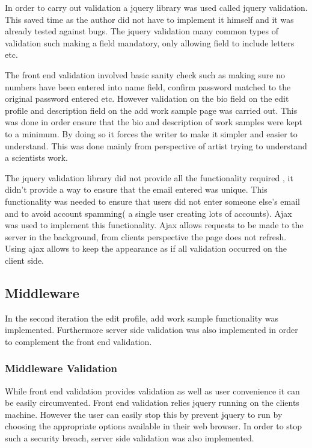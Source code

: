 \documentclass[a4paper,oneside,11pt]{report}
\begin{document}
In order to carry out validation a jquery library was used called jquery validation. This saved time as the author did not have to implement it himself and it was already tested against bugs. The jquery validation many common types of validation such making a field mandatory, only allowing field to include letters etc. 

The front end validation involved basic sanity check such as making sure no numbers have been entered into name field, confirm password matched to the original password entered etc. However validation on the bio field on the edit profile and description field on the add work sample page was carried out. This was done in order ensure that the bio and description of work samples were kept to a minimum. By doing so it forces the writer to make it simpler and easier to understand. This was done mainly from perspective of artist trying to understand a scientists work.

The jquery validation library did not provide all the functionality required , it didn’t provide a way to ensure that the email entered was unique. This functionality was needed to ensure that users did not enter someone else’s email and to avoid account spamming( a single user creating lots of accounts). Ajax was used to implement this functionality. Ajax allows requests to be made to the server in the background, from clients perspective the page does not refresh. Using ajax allows to keep the appearance as if all validation occurred on the client side.


\subsection{Middleware}
In the second iteration the edit profile, add work sample functionality was implemented. Furthermore server side validation was also implemented in order to complement the front end validation.

\pagebreak

\subsubsection{Middleware Validation}
While front end validation provides validation as well as user convenience it can be easily circumvented. Front end validation relies jquery running on the clients machine. However the user can easily stop this by prevent jquery to run by choosing the appropriate options available in their web browser. In order to stop such a security breach, server side validation was also implemented.
\end{document}
